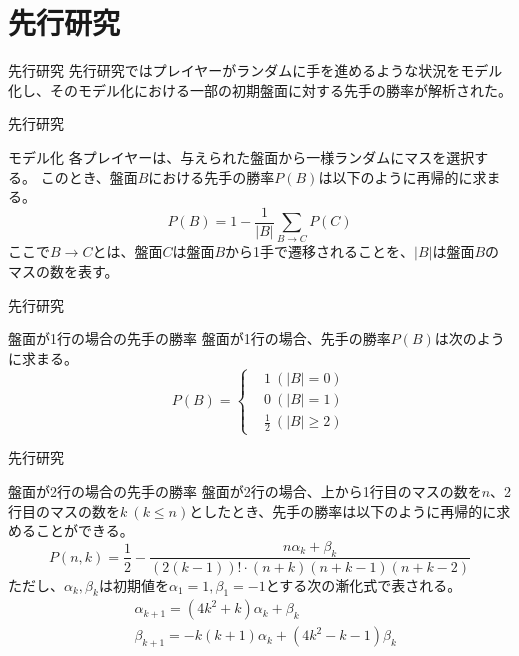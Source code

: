 \section{先行研究}
\begin{frame}{先行研究}
    先行研究\cite{ramdom_combinatorial_game_theory}ではプレイヤーがランダムに手を進めるような状況をモデル化し、そのモデル化における一部の初期盤面に対する先手の勝率が解析された。
\end{frame}

\begin{frame}{先行研究}
    \begin{block}{モデル化}
        各プレイヤーは、与えられた盤面から一様ランダムにマスを選択する。
        このとき、盤面\(B\)における先手の勝率\(P(B)\)は以下のように再帰的に求まる。
        \begin{equation}
            P(B) = 1 - \frac{1}{|B|} \sum_{B \rightarrow C} P(C)
        \end{equation}
        ここで\(B \rightarrow C\)とは、盤面\(C\)は盤面\(B\)から1手で遷移されることを、\(|B|\)は盤面\(B\)のマスの数を表す。
    \end{block}
\end{frame}

\begin{frame}{先行研究}
    \begin{block}{盤面が1行の場合の先手の勝率}
        盤面が1行の場合、先手の勝率\(P(B)\)は次のように求まる。
        \begin{equation}
            P(B) = \left\{
                \begin{aligned}
                    & 1 \ (|B| = 0) \\
                    & 0 \ (|B| = 1) \\
                    & \frac{1}{2} \ (|B| \geq 2)
                \end{aligned}
            \right.
        \end{equation}
    \end{block}
\end{frame}

\begin{frame}{先行研究}
    \begin{block}{盤面が2行の場合の先手の勝率}
        盤面が2行の場合、上から1行目のマスの数を\(n\)、2行目のマスの数を\(k \ (k \leq n)\)としたとき、先手の勝率は以下のように再帰的に求めることができる。
        \begin{equation}
            P(n, k) = \frac{1}{2} - \frac{n \alpha_k + \beta_k}{\left(2\left(k - 1\right)\right)! \cdot \left(n + k\right)\left(n + k - 1\right)\left(n + k - 2\right)}
        \end{equation}
        ただし、\(\alpha_k, \beta_k\)は初期値を\(\alpha_1 = 1, \beta_1 = -1\)とする次の漸化式で表される。
        \begin{align}
            & \alpha_{k + 1} = \left(4k^2 + k\right)\alpha_k + \beta_k \\
            & \beta_{k + 1} = -k\left(k + 1\right)\alpha_k + \left(4k^2 -k -1\right)\beta_k
        \end{align}
    \end{block}
\end{frame}
